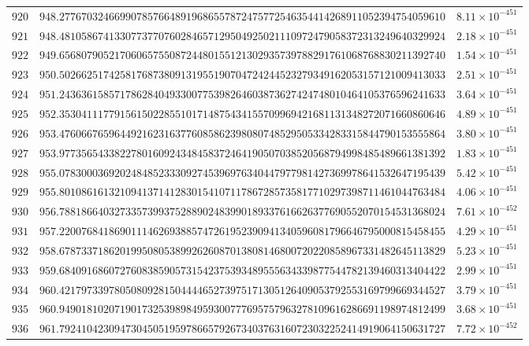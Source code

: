 \documentclass[12pt,reqno]{amsart}
\theoremstyle{remark}
\begin{document}
\begin{longtable}{clc}
$920$ & $948.2776703246699078576648919686557872475772546354414268911052394754059610$ & $8.11\times 10^{-451}$ \\
$921$ & $948.4810586741330773770760284657129504925021110972479058372313249640329924$ & $2.18\times 10^{-451}$ \\
$922$ & $949.6568079052170606575508724480155121302935739788291761068768830211392740$ & $1.54\times 10^{-451}$ \\
$923$ & $950.5026625174258176873809131955190704724244523279349162053157121009413033$ & $2.51\times 10^{-451}$ \\
$924$ & $951.2436361585717862840493300775398264603873627424748010464105376596241633$ & $3.64\times 10^{-451}$ \\
$925$ & $952.3530411177915615022855101714875434155709969421681131348272071660860646$ & $4.89\times 10^{-451}$ \\
$926$ & $953.4760667659644921623163776085862398080748529505334283315844790153555864$ & $3.80\times 10^{-451}$ \\
$927$ & $953.9773565433822780160924348458372464190507038520568794998485489661381392$ & $1.83\times 10^{-451}$ \\
$928$ & $955.0783000369202484852333092745396976340447977981427369978641532647195439$ & $5.42\times 10^{-451}$ \\
$929$ & $955.8010861613210941371412830154107117867285735817710297398711461044763484$ & $4.06\times 10^{-451}$ \\
$930$ & $956.7881866403273357399375288902483990189337616626377690552070154531368024$ & $7.61\times 10^{-452}$ \\
$931$ & $957.2200768418690111462693885747261952390941340596081796646795000815458455$ & $4.29\times 10^{-451}$ \\
$932$ & $958.6787337186201995080538992626087013808146800720220858967331482645113829$ & $5.23\times 10^{-451}$ \\
$933$ & $959.6840916860727608385905731542375393489555634339877544782139460313404422$ & $2.99\times 10^{-451}$ \\
$934$ & $960.4217973397805080928150444465273975171305126409053792553169799669344527$ & $3.79\times 10^{-451}$ \\
$935$ & $960.9490181020719017325398984959300777695757963278109616286691198974812499$ & $3.68\times 10^{-451}$ \\
$936$ & $961.7924104230947304505195978665792673403763160723032252414919064150631727$ & $7.72\times 10^{-452}$ \\

\end{longtable}
\end{document}
